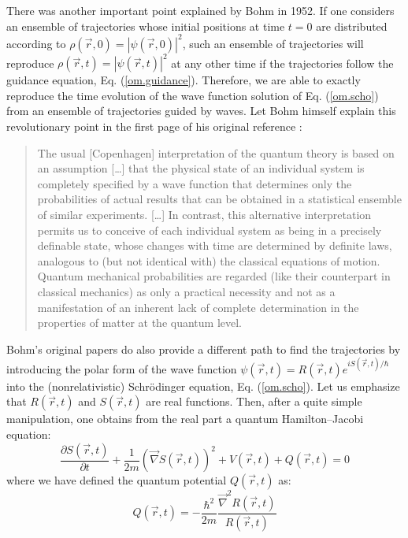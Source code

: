 \documentclass[onecolumn,nofootinbib, secnumarabic, amsmath, nobibnotes,12pt,aps,pra]{revtex4-1}
\newcommand{\eref}[1]{Eq. (\ref{#1})}
\begin{document}
There was another important point explained by Bohm in 1952. If one considers an ensemble of trajectories whose initial positions at time $t = 0$ are distributed according to $\rho(\vec{r},0) = |\psi(\vec{r},0)|^2$, such an ensemble of trajectories will reproduce $\rho(\vec{r},t) = |\psi(\vec{r},t)|^2$ at any other time if the trajectories follow the guidance equation, \eref{om.guidance}. Therefore, we are able to exactly reproduce the time evolution of the wave function solution of \eref{om.scho} from an ensemble of trajectories guided by waves. Let Bohm himself explain this revolutionary point in the first page of his original reference \cite{om.bohm1952a}:\\
\begin{quote}
The usual [Copenhagen] interpretation of the quantum theory is based
on an assumption [\ldots] that the physical state of an individual
system is completely specified by a wave function that determines
only the probabilities of actual results that can be obtained in a
statistical ensemble of similar experiments. [\ldots] In contrast,
this alternative interpretation permits us to conceive of each
individual system as being in a precisely definable state, whose
changes with time are determined by definite laws, analogous to (but
not identical with) the classical equations of motion. Quantum
mechanical probabilities are regarded (like their counterpart in
classical mechanics) as only a practical necessity and not as a
manifestation of an inherent lack of complete determination in the
properties of matter at the quantum level.\\
\end{quote}
Bohm's original papers do also provide a different path to find the trajectories by
introducing the polar form of the wave function $\psi(\vec{r},t) =
R(\vec{r},t) e^{i S(\vec{r},t)/\hbar}$ into the (nonrelativistic)
Schr\"odinger equation, \eref{om.scho}. Let us emphasize that
$R(\vec{r},t)$ and $S(\vec{r},t)$ are real functions. Then, after a
quite simple manipulation, one obtains from the real part a quantum
Hamilton--Jacobi equation:
\begin{equation}
\label{om.hamitlon2}
 \frac{\partial S(\vec{r},t)}{\partial t} + \frac{1}{2m} \left(\vec{\nabla} S(\vec{r},t)\right)^{2} + V(\vec{r},t) + Q(\vec{r},t) = 0
\end{equation}
where we have defined the quantum potential $Q(\vec{r},t)$ as:
\begin{equation}
\label{om.hamitlon3}
 Q(\vec{r},t) = -\frac{\hbar^{2}}{2 m} \frac{\vec{\nabla}^{2}R(\vec{r},t)}{R(\vec{r},t)}
\end{equation}
\end{document}
